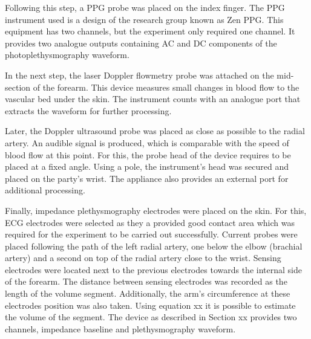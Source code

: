 

Following this step, a PPG probe was placed on the index finger. The PPG instrument used is a design of the research group known as Zen PPG. This equipment has two channels, but the experiment only required one channel. It provides two analogue outputs containing AC and DC components of the photoplethysmography waveform. 


In the next step, the laser Doppler flowmetry probe was attached on the mid-section of the forearm. This device measures small changes in blood flow to the vascular bed under the skin. The instrument counts with an analogue port that extracts the waveform for further processing.  



Later, the Doppler ultrasound probe was placed as close as possible to the radial artery. An audible signal is produced, which is comparable with the speed of blood flow at this point. For this, the probe head of the device requires to be placed at a fixed angle. Using a pole, the instrument's head was secured and placed on the party's wrist. The appliance also provides an external port for additional processing.  



Finally, impedance plethysmography electrodes were placed on the skin. For this, ECG electrodes were selected as they a provided good contact area which was required for the experiment to be carried out successfully. Current probes were placed following the path of the left radial artery, one below the elbow (brachial artery) and a second on top of the radial artery close to the wrist. Sensing electrodes were located next to the previous electrodes towards the internal side of the forearm. The distance between sensing electrodes was recorded as the length of the volume segment. Additionally, the arm's circumference at these electrodes position was also taken. Using equation xx it is possible to estimate the volume of the segment.  The device as described in Section xx provides two channels, impedance baseline and plethysmography waveform. 

